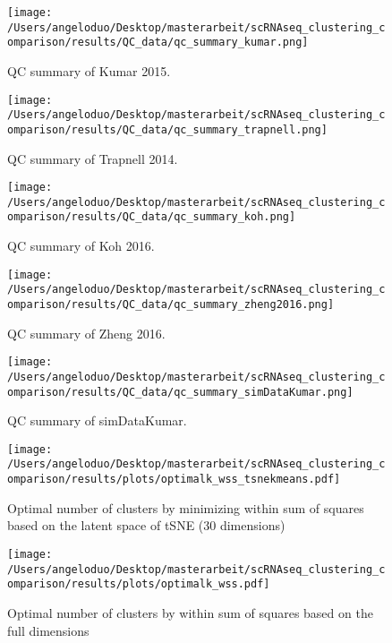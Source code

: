 \documentclass[11pt, a4paper]{article}\usepackage[]{graphicx}\usepackage[]{color}
\begin{document}
\begin{figure}[!h]
\texttt{[image: /Users/angeloduo/Desktop/masterarbeit/scRNAseq\_clustering\_comparison/results/QC\_data/qc\_summary\_kumar.png]}
\caption{QC summary of Kumar 2015. }
\label{fig:qckumar}
\end{figure}

\begin{figure}[!h]
\texttt{[image: /Users/angeloduo/Desktop/masterarbeit/scRNAseq\_clustering\_comparison/results/QC\_data/qc\_summary\_trapnell.png]}
\caption{QC summary of Trapnell 2014. }
\label{fig:qctrapnell}
\end{figure}

\begin{figure}[!h]
\texttt{[image: /Users/angeloduo/Desktop/masterarbeit/scRNAseq\_clustering\_comparison/results/QC\_data/qc\_summary\_koh.png]}
\caption{QC summary of Koh 2016. }
\label{fig:qckoh}
\end{figure}

\begin{figure}[!h]
\texttt{[image: /Users/angeloduo/Desktop/masterarbeit/scRNAseq\_clustering\_comparison/results/QC\_data/qc\_summary\_zheng2016.png]}
\caption{QC summary of Zheng 2016. }
\label{fig:qczheng}
\end{figure}

\begin{figure}[!h]
\texttt{[image: /Users/angeloduo/Desktop/masterarbeit/scRNAseq\_clustering\_comparison/results/QC\_data/qc\_summary\_simDataKumar.png]}
\caption{QC summary of simDataKumar. }
\label{fig:simDataKumar}
\end{figure}

\begin{figure}[!h]
\texttt{[image: /Users/angeloduo/Desktop/masterarbeit/scRNAseq\_clustering\_comparison/results/plots/optimalk\_wss\_tsnekmeans.pdf]}
\caption{Optimal number of clusters by minimizing within sum of squares based on the latent space of tSNE (30 dimensions) }
\label{fig:wsstsne}
\end{figure}

\begin{figure}[!h]
\texttt{[image: /Users/angeloduo/Desktop/masterarbeit/scRNAseq\_clustering\_comparison/results/plots/optimalk\_wss.pdf]}
\caption{Optimal number of clusters by within sum of squares based on the full dimensions }
\label{fig:wssorg}
\end{figure}
\end{document}
